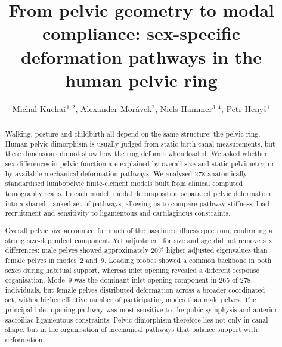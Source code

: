 \documentclass[openacc]{rsproca_new}
\begin{document}
\title{From pelvic geometry to modal compliance: sex-specific deformation pathways in the human pelvic ring}

\author{Michal Kucha\v{r}$^{1,2}$, Alexander Mor\'{a}vek$^{2}$, Niels Hammer$^{3,4}$, Petr Heny\v{s}$^{1}$}

\address{$^{1}$Institute of New Technologies and Applied Informatics, Faculty of Mechatronics, Informatics and Interdisciplinary Studies, Technical University of Liberec, Liberec, Czech Republic\\
$^{2}$Department of Anatomy, Faculty of Medicine in Hradec Kr\'{a}lov\'{e}, Charles University, Hradec Kr\'{a}lov\'{e}, Czech Republic\\
$^{3}$Division of Macroscopic and Clinical Anatomy, Gottfried Schatz Research Center, Medical University of Graz, Graz, Austria\\
$^{4}$Department of Orthopedic and Trauma Surgery, University of Leipzig, Leipzig, Germany; Division of Biomechatronics, Fraunhofer IWU, Dresden, Germany}

\subject{biomechanics, evolutionary anthropology, obstetrics}




\begin{abstract}
Walking, posture and childbirth all depend on the same structure: the pelvic ring. Human pelvic dimorphism is usually judged from static birth-canal measurements, but these dimensions do not show how the ring deforms when loaded. We asked whether sex differences in pelvic function are explained by overall size and static pelvimetry, or by available mechanical deformation pathways. We analysed 278 anatomically standardised lumbopelvic finite-element models built from clinical computed tomography scans. In each model, modal decomposition separated pelvic deformation into a shared, ranked set of pathways, allowing us to compare pathway stiffness, load recruitment and sensitivity to ligamentous and cartilaginous constraints.

Overall pelvic size accounted for much of the baseline stiffness spectrum, confirming a strong size-dependent component. Yet adjustment for size and age did not remove sex differences: male pelves showed approximately 20\% higher adjusted eigenvalues than female pelves in modes~2 and~9. Loading probes showed a common backbone in both sexes during habitual support, whereas inlet opening revealed a different response organisation. Mode~9 was the dominant inlet-opening component in 265 of 278 individuals, but female pelves distributed deformation across a broader coordinated set, with a higher effective number of participating modes than male pelves. The principal inlet-opening pathway was most sensitive to the pubic symphysis and anterior sacroiliac ligamentous constraints. Pelvic dimorphism therefore lies not only in canal shape, but in the organisation of mechanical pathways that balance support with deformation.
\end{abstract}
\end{document}
